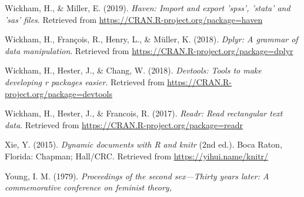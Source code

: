 \documentclass[man]{apa6}
\begin{document}
\hypertarget{ref-R-haven}{}
Wickham, H., \& Miller, E. (2019). \emph{Haven: Import and export
'spss', 'stata' and 'sas' files}. Retrieved from
\url{https://CRAN.R-project.org/package=haven}

\hypertarget{ref-R-dplyr}{}
Wickham, H., François, R., Henry, L., \& Müller, K. (2018). \emph{Dplyr:
A grammar of data manipulation}. Retrieved from
\url{https://CRAN.R-project.org/package=dplyr}

\hypertarget{ref-R-devtools}{}
Wickham, H., Hester, J., \& Chang, W. (2018). \emph{Devtools: Tools to
make developing r packages easier}. Retrieved from
\url{https://CRAN.R-project.org/package=devtools}

\hypertarget{ref-R-readr}{}
Wickham, H., Hester, J., \& Francois, R. (2017). \emph{Readr: Read
rectangular text data}. Retrieved from
\url{https://CRAN.R-project.org/package=readr}

\hypertarget{ref-R-knitr}{}
Xie, Y. (2015). \emph{Dynamic documents with R and knitr} (2nd ed.).
Boca Raton, Florida: Chapman; Hall/CRC. Retrieved from
\url{https://yihui.name/knitr/}

\hypertarget{ref-young1979}{}
Young, I. M. (1979). \emph{Proceedings of the second sex---Thirty years
later: A commemorative conference on feminist theory,}

\endgroup
\end{document}
